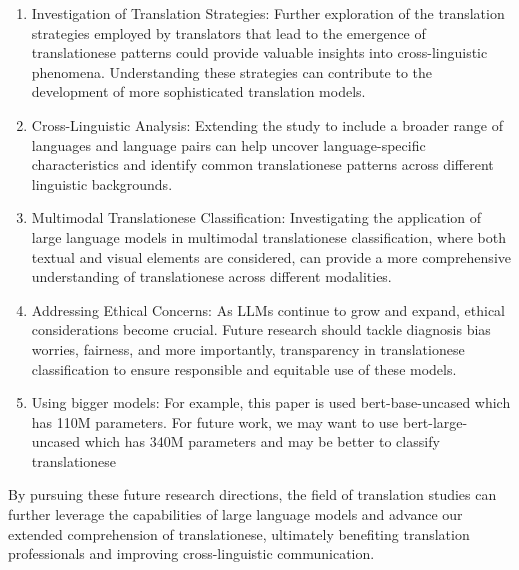 \begin{enumerate}
    \item Investigation of Translation Strategies: Further exploration of the translation strategies employed by translators that lead to the emergence of translationese patterns could provide valuable insights into cross-linguistic phenomena. Understanding these strategies can contribute to the development of more sophisticated translation models.

    \item Cross-Linguistic Analysis: Extending the study to include a broader range of languages and language pairs can help uncover language-specific characteristics and identify common translationese patterns across different linguistic backgrounds.

    \item Multimodal Translationese Classification: Investigating the application of large language models in multimodal translationese classification, where both textual and visual elements are considered, can provide a more comprehensive understanding of translationese across different modalities.

    \item Addressing Ethical Concerns: As LLMs continue to grow and expand, ethical considerations become crucial. Future research should tackle diagnosis bias worries, fairness, and more importantly, transparency in translationese classification to ensure responsible and equitable use of these models.

    \item Using bigger models: For example, this paper is used bert-base-uncased which has 110M parameters. For future work, we may want to use bert-large-uncased which has 340M parameters and may be better to classify translationese

\end{enumerate}

By pursuing these future research directions, the field of translation studies can further leverage the capabilities of large language models and advance our  extended comprehension of translationese, ultimately benefiting translation professionals and improving cross-linguistic communication.

